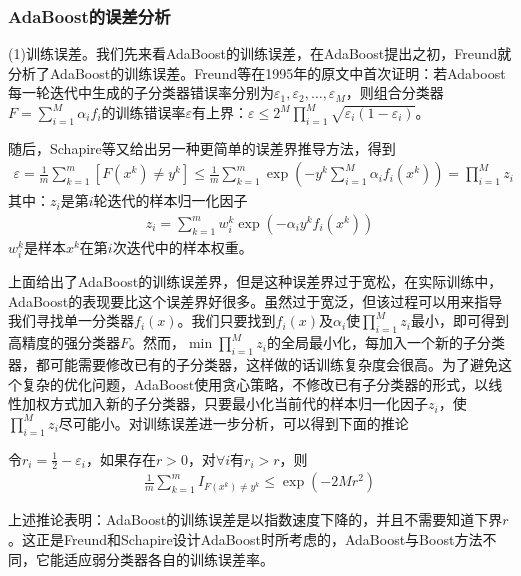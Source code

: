         \subsubsection{AdaBoost的误差分析}
            \par
            (1)训练误差。我们先来看AdaBoost的训练误差，在AdaBoost提出之初，Freund就分析了AdaBoost的训练误差。Freund等在1995年的原文中首次证明：若Adaboost每一轮迭代中生成的子分类器错误率分别为$\varepsilon_1,\varepsilon_2,\dots,\varepsilon_M$，则组合分类器$F = \sum_{i=1}^M\alpha_i f_i$的训练错误率$\varepsilon$有上界：$\varepsilon \leqslant 2^M \prod_{i=1}^M \sqrt{\varepsilon_i(1-\varepsilon_i)}$。
            \par
            随后，Schapire等又给出另一种更简单的误差界推导方法，得到
            \begin{align*}
            \varepsilon = \frac{1}{m}\sum_{k=1}^m [F(x^k)\neq y^k] \leqslant \frac{1}{m}\sum_{k=1}^m\exp \left( -y^k\sum_{i=1}^M \alpha_i f_i(x^k) \right)  = \prod_{i=1}^M z_i
            \end{align*}
            其中：$z_i$是第$i$轮迭代的样本归一化因子
            \begin{align*}
            z_i = \sum_{k=1}^m w_i^k \exp (-\alpha_iy^k f_i(x^k))
            \end{align*}
            $w_i^k$是样本$x^k$在第$i$次迭代中的样本权重。
            \par
            上面给出了AdaBoost的训练误差界，但是这种误差界过于宽松，在实际训练中，AdaBoost的表现要比这个误差界好很多。虽然过于宽泛，但该过程可以用来指导我们寻找单一分类器$f_i(x)$。我们只要找到$f_i(x)$及$\alpha_i$使$\prod_{i=1}^M z_i$最小，即可得到高精度的强分类器$F$。然而，$\min\prod_{i=1}^M z_i$的全局最小化，每加入一个新的子分类器，都可能需要修改已有的子分类器，这样做的话训练复杂度会很高。为了避免这个复杂的优化问题，AdaBoost使用贪心策略，不修改已有子分类器的形式，以线性加权方式加入新的子分类器，只要最小化当前代的样本归一化因子$z_i$，使$\prod_{i=1}^Mz_i$尽可能小。对训练误差进一步分析，可以得到下面的推论
            \begin{corollary}
            令$r_i = \frac{1}{2} - \varepsilon_i$，如果存在$r>0$，对$\forall i $有$r_i > r$，则
            \begin{align*}
            \frac{1}{m} \sum_{k=1}^m I_{F(x^k)\neq y^k} \leqslant \exp(-2Mr^2)
            \end{align*}
            \end{corollary}
            \par
            上述推论表明：AdaBoost的训练误差是以指数速度下降的，并且不需要知道下界$r$。这正是Freund和Schapire设计AdaBoost时所考虑的，AdaBoost与Boost方法不同，它能适应弱分类器各自的训练误差率。
